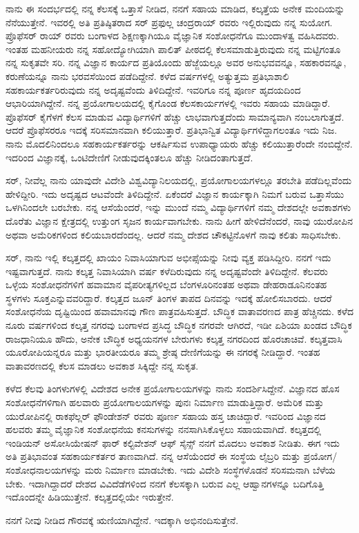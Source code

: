 ನಾನು ಈ ಸಂದರ್ಭದಲ್ಲಿ ನನ್ನ ಕೆಲಸಕ್ಕೆ ಒತ್ತಾಸೆ ನೀಡಿದ, ನನಗೆ ಸಹಾಯ ಮಾಡಿದ, ಕಲ್ಕತ್ತೆಯ ಅನೇಕ ಮಂದಿಯನ್ನು ನೆನೆಯುತ್ತೇನೆ. ಇವರಲ್ಲಿ ಅತಿ ಪ್ರತಿಷ್ಠಿತರಾದ ಸರ್ ಪ್ರಫುಲ್ಲ ಚಂದ್ರರಾಯ್ ರವರು ಇಲ್ಲಿರುವುದು ನನ್ನ ಸುಯೋಗ. ಪ್ರೊಫೆಸರ್ ರಾಯ್ ರವರು ಬಂಗಾಳದ ಶಿಕ್ಷಣಕ್ಕಾಗಿಯೂ ವೈಜ್ಞಾನಿಕ ಸಂಶೋಧನೆಗೂ ಮುಂದಾಳತ್ವ ವಹಿಸಿದವರು. ಇಂತಹ ಮಹನೀಯರು ನನ್ನ ಸಹೋದ್ಯೋಗಿಯಾಗಿ ಪಾಲಿತ್ ಪೀಠದಲ್ಲಿ ಕೆಲಸಮಾಡುತ್ತಿರುವುದು ನನ್ನ ಮಟ್ಟಿಗಂತೂ ನನ್ನ ಸುಕೃತವೇ ಸರಿ. ನನ್ನ ವಿಜ್ಞಾನ ಕಾರ್ಯದ ಪ್ರತಿಯೊಂದು ಹೆಜ್ಜೆಯಲ್ಲೂ ಅವರ ಅನುಭವವನ್ನೂ, ಸಹಕಾರವನ್ನೂ, ಕರುಣೆಯನ್ನೂ ನಾನು ಭರವಸೆಯಿಂದ ಪಡೆದಿದ್ದೇನೆ. ಕಳೆದ  ವರ್ಷಗಳಲ್ಲಿ ಅತ್ಯುತ್ತಮ ಪ್ರತಿಭಾಶಾಲಿ ಸಹಕಾರ್ಯಕರ್ತರಿರುವುದು ನನ್ನ ಅದೃಷ್ಟವೆಂದು ತಿಳಿದಿದ್ದೇನೆ. ಇವರಿಗೂ ನನ್ನ ಪೂರ್ಣ ಹೃದಯದಿಂದ ಆಭಾರಿಯಾಗಿದ್ದೇನೆ. ನನ್ನ ಪ್ರಯೋಗಾಲಯದಲ್ಲಿ ಕೈಗೊಂಡ ಕೆಲಸಕಾರ್ಯಗಳಲ್ಲಿ ಇವರು ಸಹಾಯ ಮಾಡಿದ್ದಾರೆ. ಪ್ರೊಫೆಸರ್ ಕೈಗೆಳಗೆ ಕೆಲಸ ಮಾಡುವ ವಿದ್ಯಾರ್ಥಿಗಳಿಗೆ ಹೆಚ್ಚು ಲಾಭವಾಗುತ್ತದೆಂದು ಸಾಮಾನ್ಯವಾಗಿ ನಂಬಲಾಗುತ್ತದೆ. ಆದರೆ ಪ್ರೊಫೆಸರರೂ ಇದಕ್ಕೆ ಸರಿಸಮಾನವಾಗಿ ಕಲಿಯುತ್ತಾರೆ. ಪ್ರತಿಭಾನ್ವಿತ ವಿದ್ಯಾರ್ಥಿಗಳಿದ್ದಾಗಲಂತೂ ಇದು ನಿಜ. ನಾನು ಮೊದಲಿನಿಂದಲೂ ಸಹಕಾರ್ಯಕರ್ತರನ್ನು ಆಕರ್ಷಿಸುವ ಉಪಾಧ್ಯಾಯರು ಹೆಚ್ಚು ಕಲಿಯುತ್ತಾರೆಂದೇ ನಂಬಿದ್ದೇನೆ. ಇದರಿಂದ ವಿಜ್ಞಾನಕ್ಕೆ, ಒಂಟಿದೇಣಿಗೆ ನೀಡುವುದಕ್ಕಿಂತಲೂ ಹೆಚ್ಚು ನೀಡಿದಂತಾಗುತ್ತದೆ.

ಸರ್, ನೀವೆಲ್ಲ ನಾನು ಯಾವುದೇ ವಿದೇಶಿ ವಿಶ್ವವಿದ್ಯಾನಿಲಯದಲ್ಲಿ, ಪ್ರಯೋಗಾಲಯಗಳಲ್ಲೂ ತರಬೇತಿ ಪಡೆದಿಲ್ಲವೆಂದು ಹೇಳಿದ್ದೀರಿ. ಇದು ಅದೃಷ್ಟದ ಆಟವೆಂದೇ ತಿಳಿದಿದ್ದೇನೆ. ಏಕೆಂದರೆ ವಿಜ್ಞಾನ ಕಾರ್ಯಕ್ಕಾಗಿ ನಿಮಗೆ ಬರುವ ಒತ್ತಾಸೆಯು ಒಳಗಿನಿಂದಲೇ ಬರಬೇಕು. ನನ್ನ ಆಸೆಯೆಂದರೆ, ಇನ್ನು ಮುಂದೆ ನಮ್ಮ ವಿದ್ಯಾರ್ಥಿಗಳಿಗೆ ನಮ್ಮ ದೇಶದಲ್ಲೇ ಅವಕಾಶಗಳು ದೊರೆತು ವಿಜ್ಞಾನ ಕ್ಷೇತ್ರದಲ್ಲಿ ಉತ್ತುಂಗ ಸೃಜನ ಕಾರ್ಯವಾಗಬೇಕು. ನಾನು ಹೀಗೆ ಹೇಳಿದೆನೆಂದರೆ, ನಾವು ಯುರೋಪಿನ ಅಥವಾ ಅಮೆರಿಕಗಳಿಂದ ಕಲಿಯಬಾರದೆಂದಲ್ಲ. ಆದರೆ ನಮ್ಮ ದೇಶದ ಚೌಕಟ್ಟಿನೊಳಗೆ ನಾವು ಕಲಿತು ಸಾಧಿಸಬೇಕು.

ಸರ್, ನಾನು ಇಲ್ಲಿ ಕಲ್ಕತ್ತದಲ್ಲಿ ಖಾಯಂ ನಿವಾಸಿಯಾಗುವ ಅಭೀಪ್ಸೆಯನ್ನು ನೀವು ವ್ಯಕ್ತ ಪಡಿಸಿದ್ದೀರಿ. ನನಗೆ ಇದು ಇಷ್ಟವಾಗುತ್ತದೆ. ನಾನು ಕಲ್ಕತ್ತ ನಿವಾಸಿಯಾಗಿ  ವರ್ಷ ಕಳೆದಿರುವುದು ನನ್ನ ಅದೃಷ್ಟವೆಂದೇ ತಿಳಿದಿದ್ದೇನೆ. ಕೆಲವರು ಒಳ್ಳೆಯ ಸಂಶೋಧನೆಗಳಿಗೆ ಹವಾಮಾನ ವೈಪರೀತ್ಯಗಳಿಲ್ಲದ ಬೆಂಗಳೂರಿನಂತಹ ಅಥವಾ ಡೇಹರಾಡೂನಿನಂತಹ ಸ್ಥಳಗಳು ಸೂಕ್ತ\break ಎನ್ನುವವರಿದ್ದಾರೆ. ಕಲ್ಕತ್ತದ ಜೂನ್ ತಿಂಗಳ ತಾಪದ ದಿನವನ್ನು ಇದಕ್ಕೆ ಹೋಲಿಸಬಾರದು. ಆದರೆ ಸಂಶೋಧನೆಯ ದೃಷ್ಟಿಯಿಂದ ಹವಾಮಾನವು ಗೌಣ ಪಾತ್ರವಹಿಸುತ್ತದೆ. ಬೌದ್ಧಿಕ ವಾತಾವರಣದ ಪಾತ್ರ ಹೆಚ್ಚಿನದು. ಕಳೆದ ನೂರು ವರ್ಷಗಳಿಂದ ಕಲ್ಕತ್ತ ನಗರವು ಬಂಗಾಳದ ಪ್ರಸಿದ್ಧ ಬೌದ್ಧಿಕ ನಗರವೇ ಆಗಿರದೆ, ಇಡೀ ಏಶಿಯಾ ಖಂಡದ ಬೌದ್ಧಿಕ ರಾಜಧಾನಿಯೂ ಹೌದು, ಅನೇಕ ಬೌದ್ಧಿಕ ಅಧ್ಯಯನಗಳ ಬೇರುಗಳು ಕಲ್ಕತ್ತ ನಗರದಿಂದ ಹೊರಚಾಚಿವೆ. ಕಲ್ಕತ್ತವಾಸಿ ಯೂರೋಪಿಯನ್ನರೂ ಮತ್ತು ಭಾರತೀಯರೂ ತಮ್ಮ ಶ್ರೇಷ್ಠ ದೇಣಿಗೆಯನ್ನು ಈ ನಗರಕ್ಕೆ ನೀಡಿದ್ದಾರೆ. ಇಂತಹ ವಾತಾವರಣದಲ್ಲಿ ಕೆಲಸ ಮಾಡಲು ಅವಕಾಶ ಸಿಕ್ಕಿದ್ದೇ ನನ್ನ ಸುಕೃತ.

ಕಳೆದ ಕೆಲವು ತಿಂಗಳುಗಳಲ್ಲಿ ವಿದೇಶದ ಅನೇಕ ಪ್ರಯೋಗಾಲಯಗಳನ್ನು ನಾನು ಸಂದರ್ಶಿಸಿದ್ದೇನೆ. ವಿಜ್ಞಾನದ ಹೊಸ ಸಂಶೋಧನೆಗಳಿಗಾಗಿ ಹಲವಾರು ಪ್ರಯೋಗಾಲಯಗಳನ್ನು ಪುನಃ ನಿರ್ಮಾಣ ಮಾಡುತ್ತಿದ್ದಾರೆ. ಅಮೆರಿಕ ಮತ್ತು ಯುರೋಪಿನಲ್ಲಿ ರಾಕಫೆಲ್ಲರ್ ಫೌಂಡೇಶನ್ ರವರು ಪೂರ್ಣ ಸಹಾಯ ಹಸ್ತ ಚಾಚಿದ್ದಾರೆ. ಇವರಿಂದ ವಿಜ್ಞಾನದ ಹಲವರು ತಮ್ಮ ವೈಜ್ಞಾನಿಕ ಸಂಶೋಧನೆಯ ಕನಸುಗಳನ್ನು ನನಸಾಗಿಸಿಕೊಳ್ಳಲು ಸಹಾಯವಾಗಿದೆ. ಕಲ್ಕತ್ತದಲ್ಲಿ ಇಂಡಿಯನ್ ಅಸೋಸಿಯೇಷನ್ ಫಾರ್ ಕಲ್ಟಿವೇಶನ್ ಆಫ್ ಸೈನ್ಸ್ ನನಗೆ ಮೊದಲು ಅವಕಾಶ ನೀಡಿತು. ಈಗ ಇದು ಅತಿ ಪ್ರತಿಭಾವಂತ ಸಹಕಾರ್ಯಕರ್ತರ ತಾಣವಾಗಿದೆ. ನನ್ನ ಆಸೆಯೆಂದರೆ ಈ ಸಂಸ್ಥೆಯ ಲೈಬ್ರರಿ ಮತ್ತು ಪ್ರಯೋಗ/ಸಂಶೋಧನಾಲಯಗಳನ್ನು ಮರು ನಿರ್ಮಾಣ ಮಾಡಬೇಕು. ಇದು ವಿದೇಶಿ ಸಂಸ್ಥೆಗಳೊಡನೆ ಸರಿಸಮನಾಗಿ ಬೆಳೆಯ ಬೇಕು. ಇದಾಗಿದ್ದಾದರೆ ದೇಶದ ವಿವಿದೆಡೆಗಳಿಂದ ನನಗೆ ಕೆಲಸಕ್ಕಾಗಿ ಬರುವ ಎಲ್ಲ ಆಹ್ವಾನಗಳನ್ನೂ ಬದಿಗೊತ್ತಿ ಇದೊಂದನ್ನೇ ಹಿಡಿಯುತ್ತೇನೆ. ಕಲ್ಕತ್ತದಲ್ಲಿಯೇ ಇರುತ್ತೇನೆ.

ನನಗೆ ನೀವು ನೀಡಿದ ಗೌರವಕ್ಕೆ ಋಣಿಯಾಗಿದ್ದೇನೆ. ಇದಕ್ಕಾಗಿ ಅಭಿನಂದಿಸುತ್ತೇನೆ.

